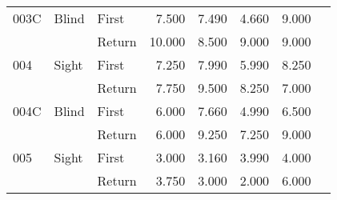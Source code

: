 \begin{table}[!htb]
\begin{tabular}{lllrrrrr}
003C & Blind & First &  7.500 &                                                 7.490 &                                                  4.660 &   9.000 \\
    &       & Return & 10.000 &                                                 8.500 &                                                  9.000 &   9.000 \\
004 & Sight & First &  7.250 &                                                 7.990 &                                                  5.990 &   8.250 \\
    &       & Return &  7.750 &                                                 9.500 &                                                  8.250 &   7.000 \\
004C & Blind & First &  6.000 &                                                 7.660 &                                                  4.990 &   6.500 \\
    &       & Return &  6.000 &                                                 9.250 &                                                  7.250 &   9.000 \\
005 & Sight & First &  3.000 &                                                 3.160 &                                                  3.990 &   4.000 \\
    &       & Return &  3.750 &                                                 3.000 &                                                  2.000 &   6.000 \\
\bottomrule
\end{tabular}
\end{table}

